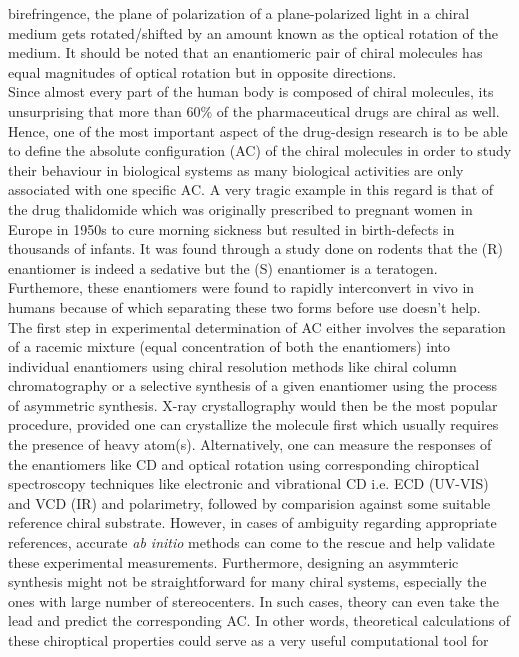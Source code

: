 birefringence, the plane of polarization of a plane-polarized light in a chiral medium gets rotated/shifted
by an amount known as the optical rotation of the medium. It should be noted that an enantiomeric pair of chiral
molecules has equal magnitudes of optical rotation but in opposite directions.\\
Since almost every part of the human body is composed of chiral molecules, its unsurprising that
more than 60\% of the pharmaceutical drugs are chiral as well. Hence, one of the most 
important aspect of the drug-design research is to be able to define the absolute configuration 
(AC) of the chiral molecules in order to study their behaviour in  biological systems as 
many biological activities are only associated with one specific AC. A very tragic example
in this regard is that of the drug thalidomide which was originally prescribed to pregnant women in 
Europe in 1950s to cure morning sickness but resulted in birth-defects in thousands of 
infants. It was found through a study done on rodents that the (R) enantiomer is indeed 
a sedative but the (S) enantiomer is a teratogen\cite{}. Furthemore, these enantiomers were 
found to rapidly interconvert in vivo in humans\cite{} because of which separating 
these two forms before use doesn't help.
\\
The first step in experimental determination of AC either involves the separation of 
a racemic mixture (equal concentration of both the enantiomers) into individual enantiomers
using chiral resolution methods like chiral column chromatography or a selective synthesis
of a given enantiomer using the process of asymmetric synthesis. X-ray crystallography would then be the 
most popular procedure, provided one can crystallize the molecule first which usually 
requires the presence of heavy atom(s). Alternatively, one can measure the responses of 
the enantiomers like CD and optical rotation using corresponding chiroptical spectroscopy
techniques like electronic and vibrational CD i.e. ECD (UV-VIS) and VCD (IR) and polarimetry,
followed by comparision against some suitable reference chiral substrate. However, in cases of 
ambiguity regarding appropriate references, accurate {\em ab initio} methods can come to the rescue and 
help validate these experimental measurements. Furthermore, designing an asymmteric synthesis might not
be straightforward for many chiral systems, especially the ones with large number of stereocenters. 
In such cases, theory can even take the lead and predict the corresponding AC. In other words, theoretical
calculations of these chiroptical properties could serve as a very useful computational tool for 
